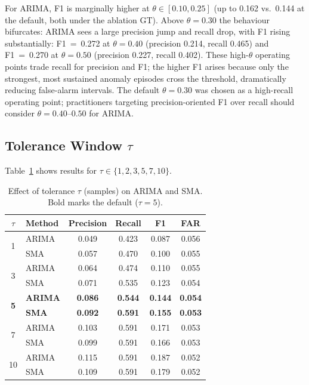 \documentclass[a4paper,fleqn]{cas-sc}
\theoremstyle{plain}
\begin{document}
For ARIMA, F1 is marginally higher at $\theta \in [0.10, 0.25]$
(up to 0.162 vs.\ 0.144 at the default, both under the ablation GT).
Above $\theta = 0.30$ the behaviour bifurcates:
ARIMA sees a large precision jump and recall drop, with F1 rising substantially:
F1~=~0.272 at $\theta=0.40$ (precision 0.214, recall 0.465) and
F1~=~0.270 at $\theta=0.50$ (precision 0.227, recall 0.402).
These high-$\theta$ operating points trade recall for precision and F1;
the higher F1 arises because only the strongest, most sustained anomaly
episodes cross the threshold, dramatically reducing false-alarm intervals.
The default $\theta = 0.30$ was chosen as a high-recall operating point;
practitioners targeting precision-oriented F1 over recall should consider
$\theta = 0.40$--$0.50$ for ARIMA.

\subsection{Tolerance Window \texorpdfstring{$\tau$}{tau}}\label{sec:ablation:tau}

Table~\ref{tab:ablation_tau} shows results for $\tau \in \{1, 2, 3, 5, 7, 10\}$.

\begin{table}[tbp]
\centering
\begin{tabular}{clcccc}
\toprule
$\tau$ & Method & Precision & Recall & F1 & FAR \\
\midrule
\multirow{2}{*}{1}  & ARIMA & 0.049 & 0.423 & 0.087 & 0.056 \\
                    & SMA   & 0.057 & 0.470 & 0.100 & 0.055 \\
\multirow{2}{*}{3}  & ARIMA & 0.064 & 0.474 & 0.110 & 0.055 \\
                    & SMA   & 0.071 & 0.535 & 0.123 & 0.054 \\
\multirow{2}{*}{\textbf{5}}  & \textbf{ARIMA} & \textbf{0.086} & \textbf{0.544} & \textbf{0.144} & \textbf{0.054} \\
                    & \textbf{SMA}   & \textbf{0.092} & \textbf{0.591} & \textbf{0.155} & \textbf{0.053} \\
\multirow{2}{*}{7}  & ARIMA & 0.103 & 0.591 & 0.171 & 0.053 \\
                    & SMA   & 0.099 & 0.591 & 0.166 & 0.053 \\
\multirow{2}{*}{10} & ARIMA & 0.115 & 0.591 & 0.187 & 0.052 \\
                    & SMA   & 0.109 & 0.591 & 0.179 & 0.052 \\
\bottomrule
\end{tabular}
\caption{Effect of tolerance $\tau$ (samples) on ARIMA and SMA.
  Bold marks the default ($\tau = 5$).}
\label{tab:ablation_tau}
\end{table}
\end{document}

